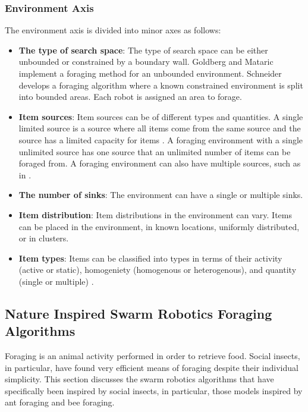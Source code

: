 \subsubsection{Environment Axis}
\label{environmentaxis}
The environment axis is divided into minor axes as follows:
\begin{itemize}
\item \textbf{The type of search space}: The type of search space can be either unbounded or constrained by a boundary wall. Goldberg and Mataric \cite{Goldberg01designand} implement a foraging method for an unbounded environment. Schneider \cite{schneider1998territorial} develops a foraging algorithm where a known constrained environment is split into bounded areas. Each robot is assigned an area to forage.

\item \textbf{Item sources}: Item sources can be of different types and quantities. A single limited source is a source where all items come from the same source and the source has a limited capacity for items \cite{sugawara2002swarming}. A foraging environment with a single unlimited source has one source that an unlimited number of items can be foraged from. A foraging environment can also have multiple sources, such as in \cite{Goldberg01designand}. 

\item \textbf{The number of sinks}: The environment can have a single or multiple sinks. 

\item \textbf{Item distribution}: Item distributions in the environment can vary. Items can be placed  in the environment, in known locations, uniformly distributed, or in clusters.

\item \textbf{Item types}: Items can be classified into types in terms of their activity (active or static), homogeniety (homogenous or heterogenous), and quantity (single or multiple) \cite{Balch99rewardand,
 campo2007efficient, jones2003adaptive}.

\end{itemize}



\subsection{Nature Inspired Swarm Robotics Foraging Algorithms}
\label{sec:second:natureinspiredalgs}
Foraging is an animal activity performed in order to retrieve food. Social insects, in particular, have found very efficient means of foraging despite their individual simplicity. This section discusses the swarm robotics algorithms that have specifically been inspired by social insects, in particular, those models inspired by ant foraging and bee foraging. 


